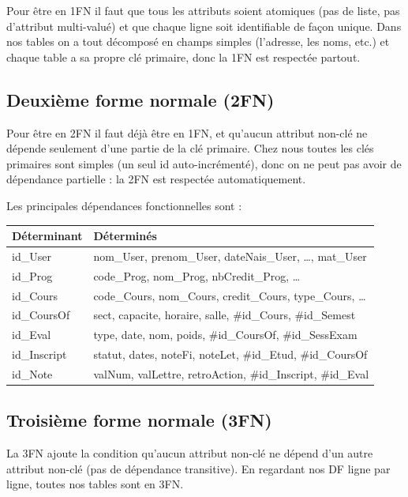 \documentclass[11pt,a4paper]{article}
\begin{document}
Pour être en 1FN il faut que tous les attributs soient atomiques (pas
de liste, pas d'attribut multi-valué) et que chaque ligne soit
identifiable de façon unique. Dans nos tables on a tout décomposé en
champs simples (l'adresse, les noms, etc.) et chaque table a sa propre
clé primaire, donc la 1FN est respectée partout.

\subsection{Deuxième forme normale (2FN)}

Pour être en 2FN il faut déjà être en 1FN, et qu'aucun attribut non-clé
ne dépende seulement d'une partie de la clé primaire. Chez nous toutes
les clés primaires sont simples (un seul id auto-incrémenté), donc on
ne peut pas avoir de dépendance partielle : la 2FN est respectée
automatiquement.

Les principales dépendances fonctionnelles sont :
\begin{center}\small
\begin{tabular}{@{}ll@{}}
\toprule
\textbf{Déterminant} & \textbf{Déterminés} \\
\midrule
id\_User      & nom\_User, prenom\_User, dateNais\_User, \ldots, mat\_User \\
id\_Prog      & code\_Prog, nom\_Prog, nbCredit\_Prog, \ldots \\
id\_Cours     & code\_Cours, nom\_Cours, credit\_Cours, type\_Cours, \ldots \\
id\_CoursOf   & sect, capacite, horaire, salle, \#id\_Cours, \#id\_Semest \\
id\_Eval      & type, date, nom, poids, \#id\_CoursOf, \#id\_SessExam \\
id\_Inscript  & statut, dates, noteFi, noteLet, \#id\_Etud, \#id\_CoursOf \\
id\_Note      & valNum, valLettre, retroAction, \#id\_Inscript, \#id\_Eval \\
\bottomrule
\end{tabular}
\end{center}

\subsection{Troisième forme normale (3FN)}

La 3FN ajoute la condition qu'aucun attribut non-clé ne dépend d'un
autre attribut non-clé (pas de dépendance transitive). En regardant
nos DF ligne par ligne, toutes nos tables sont en 3FN.
\end{document}
